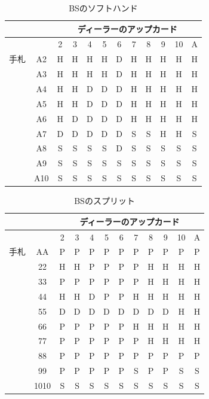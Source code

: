 \begin{table}[htbp]
  \centering
  \caption{BSのソフトハンド\label{bs_soft}}
  \begin{tabular}{|c|c|c|c|c|c|c|c|c|c|c|c|}
    \hline
    \multicolumn{2}{|c|}{} & \multicolumn{10}{|c|}{ディーラーのアップカード} \\ \hline
    \multicolumn{2}{|c|}{} & 2 & 3 & 4 & 5 & 6 & 7 & 8 & 9 & 10 & A \\ \hline
    手札 & A2 & H & H & H & H & D & H & H & H & H & H \\ \cline{3-12}
              & A3 & H & H & H & H & D & H & H & H & H & H \\ \cline{3-12}
              & A4 & H & H & D & D & D & H & H & H & H & H \\ \cline{3-12}
              & A5 & H & H & D & D & D & H & H & H & H & H \\ \cline{3-12}
              & A6 & H & D & D & D & D & H & H & H & H & H \\ \cline{3-12}
              & A7 & D & D & D & D & D & S & S & H & H & S \\ \cline{3-12}
              & A8 & S & S & S & S & D & S & S & S & S & S \\ \cline{3-12}
              & A9 & S & S & S & S & S & S & S & S & S & S \\ \cline{3-12}
              & A10 & S & S & S & S & S & S & S & S & S & S \\ \hline
  \end{tabular}
\end{table}

\begin{table}[htbp]
  \centering
  \caption{BSのスプリット\label{bs_sprit}}
  \begin{tabular}{|c|c|c|c|c|c|c|c|c|c|c|c|}
    \hline
    \multicolumn{2}{|c|}{} & \multicolumn{10}{|c|}{ディーラーのアップカード} \\ \hline
    \multicolumn{2}{|c|}{} & 2 & 3 & 4 & 5 & 6 & 7 & 8 & 9 & 10 & A \\ \hline
    手札 & AA & P & P & P & P & P & P & P & P & P & P \\ \cline{3-12}
              & 22 & H & H & P & P & P & P & H & H & H & H \\ \cline{3-12}
              & 33 & P & P & P & P & P & P & H & H & H & H \\ \cline{3-12}
              & 44 & H & H & D & P & P & H & H & H & H & H \\ \cline{3-12}
              & 55 & D & D & D & D & D & D & D & D & H & H \\ \cline{3-12}
              & 66 & P & P & P & P & P & H & H & H & H & H \\ \cline{3-12}
              & 77 & P & P & P & P & P & P & H & H & H & H \\ \cline{3-12}
              & 88 & P & P & P & P & P & P & P & P & P & P \\ \cline{3-12}
              & 99 & P & P & P & P & P & S & P & P & S & S \\ \cline{3-12}
              & 1010 & S & S & S & S & S & S & S & S & S & S \\ \hline
  \end{tabular}
\end{table}

